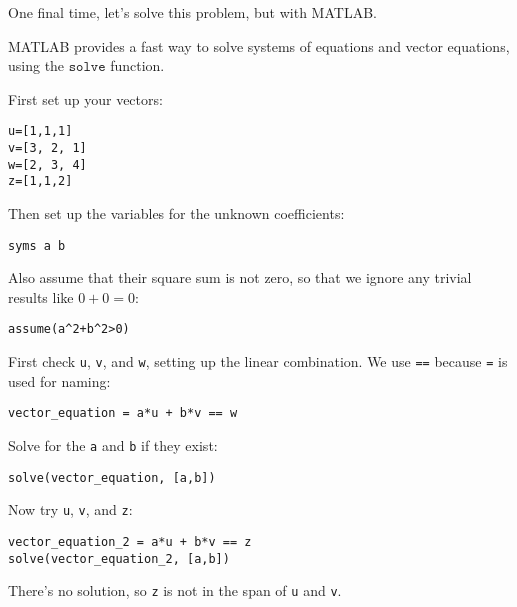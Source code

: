 \documentclass{ximera}
\begin{document}
\begin{exploration}
\begin{example}
  \begin{solution}
  
    One final time, let's solve this problem, but with MATLAB. 

    MATLAB provides a fast way to solve systems of equations and vector equations, using the $\texttt{solve}$ function.

    First set up your vectors:
\begin{verbatim}
u=[1,1,1]
v=[3, 2, 1]
w=[2, 3, 4]
z=[1,1,2]
\end{verbatim}

Then set up the variables for the unknown coefficients:
\begin{verbatim}
syms a b
\end{verbatim}

Also assume that their square sum is not zero, so that we ignore any trivial results like \(0 + 0 = 0\):
\begin{verbatim}
assume(a^2+b^2>0)
\end{verbatim}

First check \verb|u|, \verb|v|, and \verb|w|, setting up the linear combination. We use \verb|==| because \verb|=| is used for naming:
\begin{verbatim}
vector_equation = a*u + b*v == w
\end{verbatim}

Solve for the \verb|a| and \verb|b| if they exist:
\begin{verbatim}
solve(vector_equation, [a,b])
\end{verbatim}

Now try \verb|u|, \verb|v|, and \verb|z|:
\begin{verbatim}
vector_equation_2 = a*u + b*v == z
solve(vector_equation_2, [a,b])
\end{verbatim}

There's no solution, so \verb|z| is not in the span of \verb|u| and \verb|v|.


  \end{solution}
  
\end{example}

\end{exploration}
\end{document}
